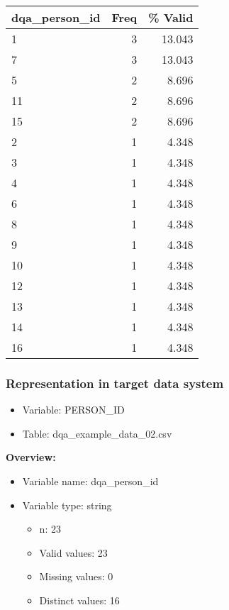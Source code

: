 \documentclass[
]{article}
\providecommand{\tightlist}{%
  \setlength{\itemsep}{0pt}\setlength{\parskip}{0pt}}
\begin{document}
\begin{table}[H]
\centering
\begin{tabular}{l|r|r}
\hline
\textbf{dqa\_person\_id} & \textbf{Freq} & \textbf{\% Valid}\\
\hline
1 & 3 & 13.043\\
\hline
7 & 3 & 13.043\\
\hline
5 & 2 & 8.696\\
\hline
11 & 2 & 8.696\\
\hline
15 & 2 & 8.696\\
\hline
2 & 1 & 4.348\\
\hline
3 & 1 & 4.348\\
\hline
4 & 1 & 4.348\\
\hline
6 & 1 & 4.348\\
\hline
8 & 1 & 4.348\\
\hline
9 & 1 & 4.348\\
\hline
10 & 1 & 4.348\\
\hline
12 & 1 & 4.348\\
\hline
13 & 1 & 4.348\\
\hline
14 & 1 & 4.348\\
\hline
16 & 1 & 4.348\\
\hline
\end{tabular}
\end{table}
\newpage

\hypertarget{representation-in-target-data-system-10}{%
\subsubsection{\texorpdfstring{Representation in \textbf{target} data
system}{Representation in target data system}}\label{representation-in-target-data-system-10}}

\begin{itemize}
\tightlist
\item
  Variable: PERSON\_ID
\item
  Table: dqa\_example\_data\_02.csv
\end{itemize}

\textbf{Overview:}

\begin{itemize}
\tightlist
\item
  Variable name: dqa\_person\_id
\item
  Variable type: string

  \begin{itemize}
  \tightlist
  \item
    n: 23
  \item
    Valid values: 23
  \item
    Missing values: 0
  \item
    Distinct values: 16
  \end{itemize}
\end{itemize}
\end{document}
